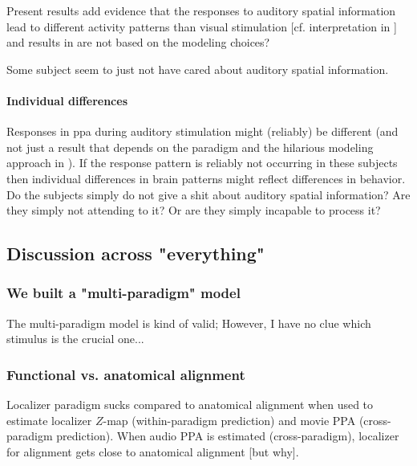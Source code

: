 %
Present results add evidence that the responses to auditory spatial information
lead to different activity patterns than visual stimulation [cf. interpretation
in \citet{haeusler2022processing}] and results in \citet{haeusler2022processing}
are not based on the modeling choices?

%
Some subject seem to just not have cared about auditory spatial information.


\paragraph{Individual differences}

%
Responses in \ac{ppa} during auditory stimulation might (reliably) be
different (and not just a result that depends on the paradigm and the hilarious
modeling approach in \citet{haeusler2022processing}).
%
If the response pattern is reliably not occurring in these subjects then
individual differences in brain patterns might reflect differences in behavior.
%
Do the subjects simply do not give a shit about auditory spatial information?
%
Are they simply not attending to it? Or are they simply incapable to process it?




\subsection{Discussion across "everything"}

\subsubsection{We built a "multi-paradigm" model}



The multi-paradigm model is kind of valid;
%
However, I have no clue which stimulus is the crucial one...


\subsubsection{Functional vs. anatomical alignment}

Localizer paradigm sucks compared to anatomical alignment when used to estimate
localizer $Z$-map (within-paradigm prediction) and movie PPA (cross-paradigm
prediction).
%
When audio PPA is estimated (cross-paradigm), localizer for alignment gets close
to anatomical alignment [but why].

